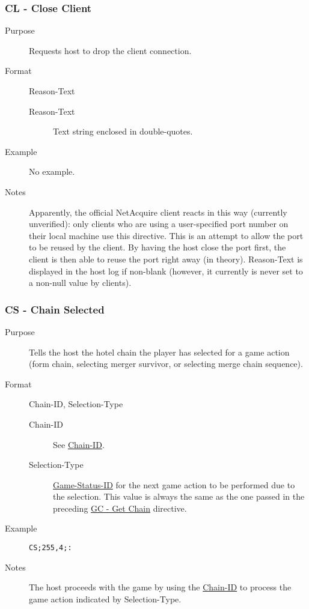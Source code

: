 \documentclass{article}
\providecommand{\wiredata}[1]{\texttt{{#1}}}
\begin{document}

\subsubsection{CL - Close Client} %
\label{ssub:cl_close_client}

\begin{description}
  \item[Purpose] Requests host to drop the client connection.
  \item[Format] Reason-Text
  \begin{description}
    \item[Reason-Text] Text string enclosed in double-quotes.
  \end{description}
  \item[Example] No example.
  \item[Notes] Apparently, the official NetAcquire client reacts in this way (currently unverified): only clients who are using a user-specified port number on their local machine use this directive. This is an attempt to allow the port to be reused by the client. By having the host close the port first, the client is then able to reuse the port right away (in theory). Reason-Text is displayed in the host log if non-blank (however, it currently is never set to a non-null value by clients).
\end{description}


\subsubsection{CS - Chain Selected} %
\label{ssub:cs_chain_selected}

\begin{description}
  \item[Purpose] Tells the host the hotel chain the player has selected for a game action (form chain, selecting merger survivor, or selecting merge chain sequence).
  \item[Format] Chain-ID, Selection-Type
  \begin{description}
    \item[Chain-ID] See \hyperref[ssub:chain_id]{Chain-ID}.
    \item[Selection-Type] \hyperref[ssub:game_status_id]{Game-Status-ID} for the next game action to be performed due to the selection. This value is always the same as the one passed in the preceding \hyperref[ssub:gc_get_chain]{GC - Get Chain} directive.
  \end{description}
  \item[Example] \wiredata{CS;255,4;:}
  \item[Notes] The host proceeds with the game by using the \hyperref[ssub:chain_id]{Chain-ID} to process the game action indicated by Selection-Type.
\end{description}
\end{document}
